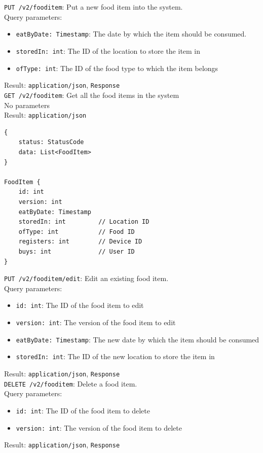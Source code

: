 \documentclass[12pt]{report}
\begin{document}
\texttt{PUT /v2/fooditem}: Put a new food item into the system.\\
Query parameters:
\begin{itemize}
\item \texttt{eatByDate: Timestamp}: The date by which the item should be
consumed.
\item \texttt{storedIn: int}: The ID of the location to store the item in
\item \texttt{ofType: int}: The ID of the food type to which the item belongs
\end{itemize}
Result: \texttt{application/json}, \texttt{Response}\vspace{7mm}\\
\texttt{GET /v2/fooditem}: Get all the food items in the system\\
No parameters\\
Result: \texttt{application/json}
\begin{lstlisting}
{
    status: StatusCode
    data: List<FoodItem>
}

FoodItem {
	id: int
	version: int
	eatByDate: Timestamp
	storedIn: int         // Location ID
	ofType: int           // Food ID
	registers: int        // Device ID
	buys: int             // User ID
}
\end{lstlisting}
\texttt{PUT /v2/fooditem/edit}: Edit an existing food item.\\
Query parameters:
\begin{itemize}
\item \texttt{id: int}: The ID of the food item to edit
\item \texttt{version: int}: The version of the food item to edit
\item \texttt{eatByDate: Timestamp}: The new date by which the item should be
consumed
\item \texttt{storedIn: int}: The ID of the new location to store the item in
\end{itemize}
Result: \texttt{application/json}, \texttt{Response}\vspace{7mm}\\

\texttt{DELETE /v2/fooditem}: Delete a food item.\\
Query parameters:
\begin{itemize}
\item \texttt{id: int}: The ID of the food item to delete
\item \texttt{version: int}: The version of the food item to delete
\end{itemize}
Result: \texttt{application/json}, \texttt{Response}\vspace{7mm}\\
\end{document}
